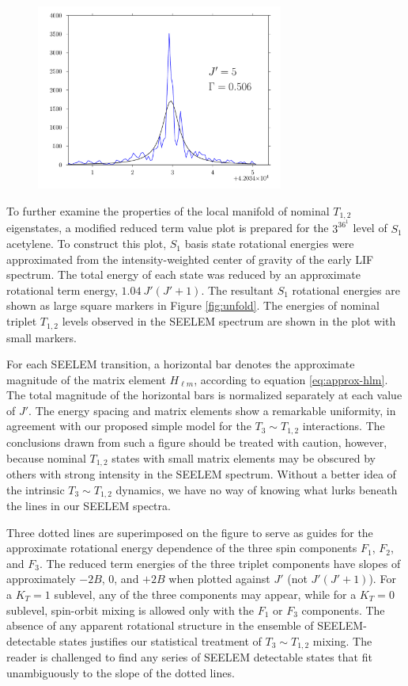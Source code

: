 \begin{figure}
  \includegraphics[width=3.2in]{3361-q5-seelemfit}
\end{figure}


To further examine the properties of the local manifold of nominal
$T_{1,2}$ eigenstates, a modified reduced term value plot is prepared
for the $3^36^1$  level of $S_1$ acetylene.  To construct this
plot, $S_1$ basis state rotational energies were approximated from the
intensity-weighted center of gravity of the early LIF spectrum.  The
total energy of each state was reduced by an approximate rotational
term energy, $1.04 \: J'(J'+1)$.  The resultant $S_1$ rotational
energies are shown as large square markers in Figure \ref{fig:unfold}.
The energies of nominal triplet $T_{1,2}$ levels observed in the
SEELEM spectrum are shown in the plot with small markers.

For each SEELEM transition, a horizontal bar denotes the approximate
magnitude of the matrix element $H_{\ell m}$, according to equation
\ref{eq:approx-hlm}.  The total magnitude of the horizontal bars is
normalized separately at each value of $J'$.  The energy spacing and
matrix elements show a remarkable uniformity, in agreement with our
proposed simple model for the $T_3 \sim T_{1,2}$ interactions.  The
conclusions drawn from such a figure should be treated with caution,
however, because nominal $T_{1,2}$ states with small matrix elements
may be obscured by others with strong intensity in the SEELEM
spectrum.  Without a better idea of the intrinsic $T_3 \sim T_{1,2}$
dynamics, we have no way of knowing what lurks beneath the lines in
our SEELEM spectra.

Three dotted lines are superimposed on the figure to serve as guides
for the approximate rotational energy dependence of the three spin
components $F_1$, $F_2$, and $F_3$.  The reduced term energies of the
three triplet components have slopes of approximately $-2B$, 0, and
$+2B$ when plotted against $J'$ (not $J'(J'+1)$).  For a $K_T=1$
sublevel, any of the three components may appear, while for a $K_T=0$
sublevel, spin-orbit mixing is allowed only with the $F_1$ or $F_3$
components.  The absence of any apparent rotational structure in the
ensemble of SEELEM-detectable states justifies our statistical
treatment of $T_3 \sim T_{1,2}$ mixing.  The reader is challenged to
find any series of SEELEM detectable states that fit unambiguously to
the slope of the dotted lines.

